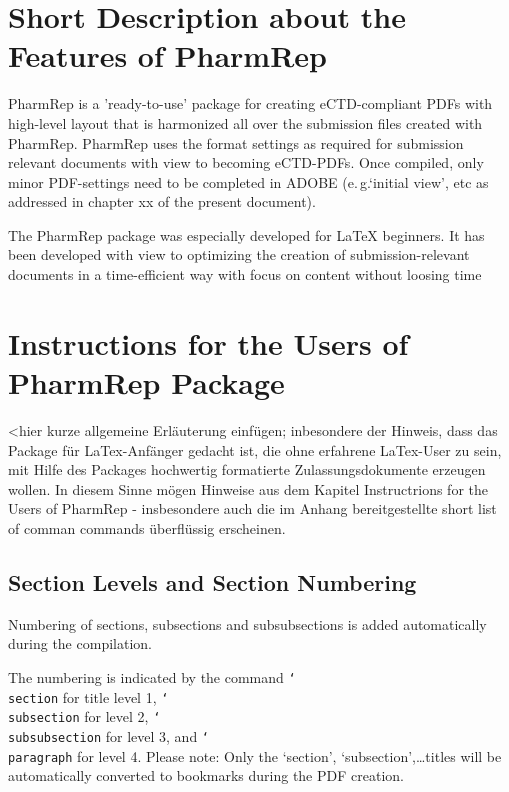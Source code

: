 \documentclass{pharmrep}
\newcommand{\PharmRep}{\textsf{PharmRep}\xspace}
\DeclareRobustCommand\cs[1]{\texttt{\char`\\#1}}
\newcommand{\eg}{e.\,g.\xspace}
\begin{document}
\section{Short Description about the Features of \PharmRep}
PharmRep is a 'ready-to-use' package for creating eCTD-compliant PDFs with high-level layout that is
harmonized all over the submission files created with \PharmRep. \PharmRep uses the format settings as
required for submission relevant documents with view to becoming eCTD-PDFs. Once compiled, only
minor PDF-settings need to be completed in ADOBE (\eg `initial view', etc as addressed in chapter xx of the
present document).

The \PharmRep package was especially developed for \LaTeX{} beginners. It has been developed with view to
optimizing the creation of submission-relevant documents in a time-efficient way with focus on content
without loosing time

\section{Instructions for the Users of \PharmRep Package}
<hier kurze allgemeine Erläuterung einfügen; inbesondere der Hinweis, dass das Package für
LaTex-Anfänger gedacht ist, die ohne erfahrene LaTex-User zu sein, mit Hilfe des Packages hochwertig
formatierte Zulassungsdokumente erzeugen wollen. In diesem Sinne mögen Hinweise aus dem Kapitel
Instructrions for the Users of PharmRep - insbesondere auch die im Anhang bereitgestellte short list of
comman commands überflüssig erscheinen.

\subsection{Section Levels and Section Numbering}
Numbering of sections, subsections and subsubsections is added automatically during the compilation.

The numbering is indicated by the command \cs{section} for title level 1, \cs{subsection} for level 2,
\cs{subsubsection} for level 3, and \cs{paragraph} for level 4.
Please note: Only the `section', `subsection',\dots titles will be automatically converted to bookmarks during
the PDF creation.
\end{document}
